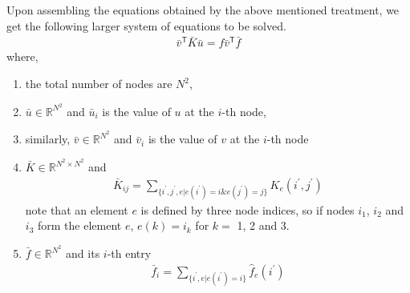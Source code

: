 \documentclass{article}
\begin{document}
Upon assembling the equations obtained by the above mentioned treatment,
we get the following larger system of equations to be solved.
\begin{align*}
	\bar{v}^{\mathsf{T}} \bar{K} \bar{u} = f \bar{v}^{\mathsf{T}} \bar{f}
\end{align*}
where,
\begin{enumerate}
	\item the total number of nodes are $N^2$,
	\item $\bar{u} \in \mathbb{R}^{N^2}$
		and $\bar{u}_i$ is the value of $u$ at the $i$-th node,
	\item similarly,
		$\bar{v} \in \mathbb{R}^{N^2}$
		and $\bar{v}_i$ is the value of $v$ at the $i$-th node
	\item $\bar{K} \in \mathbb{R}^{N^2 \times N^2}$ and
		\begin{align*}
			\bar{K}_{ij} = \sum_{\{ i^\prime,j^\prime,e | e(i^\prime) = i \& e(j^\prime) = j \}} K_e(i^\prime, j^\prime)
		\end{align*}
		note that an element $e$ is defined by three node indices,
		so if nodes $i_1$, $i_2$ and $i_3$ form the element $e$,
		$e(k) = i_k$ for $k=$ 1, 2 and 3.
	\item $\bar{f} \in \mathbb{R}^{N^2}$ and its $i$-th entry
		\begin{align*}
			\bar{f}_i = \sum_{\{ i^\prime,e | e(i^\prime) = i\}} \hat{f}_e(i^\prime)
		\end{align*}
\end{enumerate}
\end{document}
